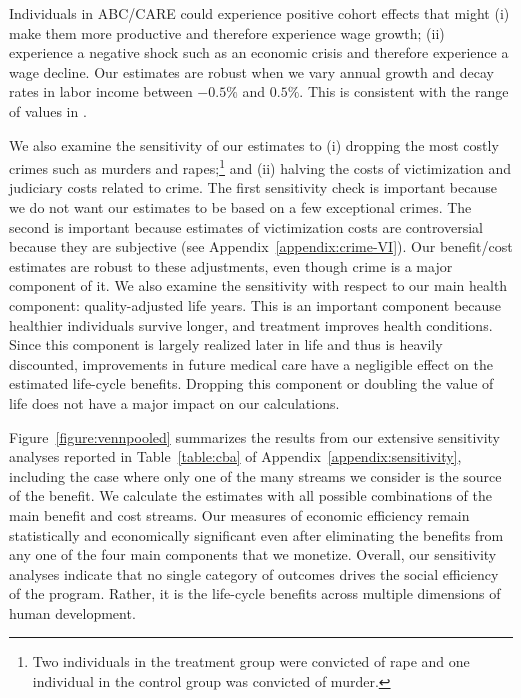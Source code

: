 Individuals in ABC/CARE could experience positive cohort effects that might (i) make them more productive and therefore experience wage growth; (ii) experience a negative shock such as an economic crisis and therefore experience a wage decline. Our estimates are robust when we vary annual growth and decay rates in labor income between $-0.5\%$ and $0.5\%$. This is consistent with the range of values in \citet{Lagakos_Moll_etal_2016_LifeCycle_NBER}.

We also examine the sensitivity of our estimates to (i) dropping the most costly crimes such as murders and rapes;\footnote{Two individuals in the treatment group were convicted of rape and one individual in the control group was convicted of murder.} and (ii) halving the costs of victimization and judiciary costs related to crime. The first sensitivity check is important because we do not want our estimates to be based on a few exceptional crimes. The second is important because estimates of victimization costs are controversial because they are subjective (see  Appendix~\ref{appendix:crime-VI}). Our benefit/cost estimates are robust to these adjustments, even though crime is a major component of it. We also examine the sensitivity with respect to our main health component: quality-adjusted life years. This is an important component because healthier individuals survive longer, and treatment improves health conditions. Since this component is largely realized later in life and thus is heavily discounted, improvements in future medical care have a negligible effect on the estimated life-cycle benefits. Dropping this component or doubling the value of life does not have a major impact on our calculations.

Figure~\ref{figure:vennpooled} summarizes the results from our extensive sensitivity analyses reported in Table~\ref{table:cba} of Appendix~\ref{appendix:sensitivity}, including the case where only one of the many streams we consider is the source of the benefit. We calculate the estimates with all possible combinations of the main benefit and cost streams. Our measures of economic efficiency remain statistically and economically significant even after eliminating the benefits from any one of the four main components that we monetize.  Overall, our sensitivity analyses indicate that no single category of outcomes drives the social efficiency of the program. Rather, it is the life-cycle benefits across multiple dimensions of human development.

